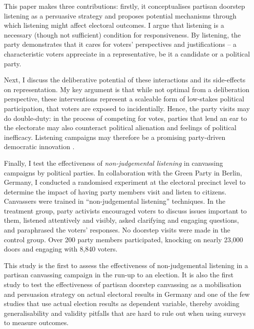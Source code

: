 \documentclass[11pt,a4paper]{scrartcl}
\begin{document}
This paper makes three contributions: firstly, it conceptualises partisan doorstep listening as a persuasive strategy and proposes potential mechanisms through which listening might affect electoral outcomes. I argue that listening is a necessary (though not sufficient) condition for responsiveness. By listening, the party demonstrates that it cares for voters' perspectives and justifications -- a characteristic voters appreciate in a representative, be it a candidate or a political party.

Next, I discuss the deliberative potential of these interactions and its side-effects on representation. My key argument is that while not optimal from a deliberation perspective, these interventions represent a scaleable form of low-stakes political participation, that voters are exposed to incidentially. Hence, the party visits may do double-duty: in the process of competing for votes, parties that lend an ear to the electorate may also counteract political alienation and feelings of political inefficacy. Listening campaigns may therefore be a promising party-driven democratic innovation \autocite[cf.][]{farrellDemocraticInnovationPolitical2025}.

Finally, I test the effectiveness of \emph{non-judgemental listening} in canvassing campaigns by political parties. In collaboration with the Green Party in Berlin, Germany, I conducted a randomised experiment at the electoral precinct level to determine the impact of having party members visit and listen to citizens. Canvassers were trained in \enquote{non-judgemental listening} techniques. In the treatment group, party activists encouraged voters to discuss issues important to them, listened attentively and visibly, asked clarifying and engaging questions, and paraphrased the voters' responses. No doorstep visits were made in the control group. Over 200 party members participated, knocking on nearly 23,000 doors and engaging with 8,840 voters.

This study is the first to assess the effectiveness of non-judgemental listening in a partisan canvassing campaign in the run-up to an election. It is also the first study to test the effectiveness of partisan doorstep canvassing as a mobilisation and persuasion strategy on actual electoral results in Germany and one of the few studies that use actual election results as dependent variable, thereby avoiding generalisability and validity pitfalls that are hard to rule out when using surveys to measure outcomes.
\end{document}
